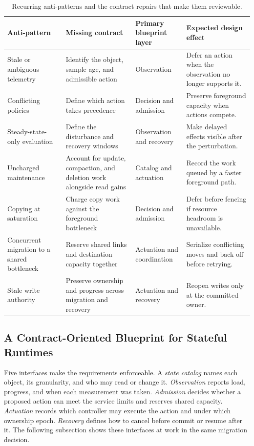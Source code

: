 \documentclass[manuscript]{acmart}
\begin{document}
\begin{table}[t]
\small
\caption{Recurring anti-patterns and the contract repairs that make them reviewable.}
\label{tab:antipattern-repairs}
\begin{tabular}{@{}p{}p{}p{}p{}@{}}
\toprule
Anti-pattern & Missing contract & Primary blueprint layer & Expected design effect \\
\midrule
Stale or ambiguous telemetry & Identify the object, sample age, and admissible action & Observation & Defer an action when the observation no longer supports it. \\

Conflicting policies & Define which action takes precedence & Decision and admission & Preserve foreground capacity when actions compete. \\

Steady-state-only evaluation & Define the disturbance and recovery windows & Observation and recovery & Make delayed effects visible after the perturbation. \\

Uncharged maintenance & Account for update, compaction, and deletion work alongside read gains & Catalog and actuation & Record the work queued by a faster foreground path. \\

Copying at saturation & Charge copy work against the foreground bottleneck & Decision and admission & Defer before fencing if resource headroom is unavailable. \\

Concurrent migration to a shared bottleneck & Reserve shared links and destination capacity together & Actuation and coordination & Serialize conflicting moves and back off before retrying. \\

Stale write authority & Preserve ownership and progress across migration and recovery & Actuation and recovery & Reopen writes only at the committed owner. \\
\bottomrule
\end{tabular}
\end{table}

\subsection{A Contract-Oriented Blueprint for Stateful Runtimes}

Five interfaces make the requirements enforceable. A \emph{state catalog} names each object, its granularity, and who may read or change it. \emph{Observation} reports load, progress, and when each measurement was taken. \emph{Admission} decides whether a proposed action can meet the service limits and reserves shared capacity. \emph{Actuation} records which controller may execute the action and under which ownership epoch. \emph{Recovery} defines how to cancel before commit or resume after it. The following subsection shows these interfaces at work in the same migration decision.
\end{document}
